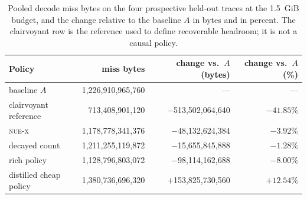 \begin{table}[t]
\centering
\caption{Pooled decode miss bytes on the four prospective held-out traces at the 1.5~GiB budget, and the change relative to the baseline $A$ in bytes and in percent. The clairvoyant row is the reference used to define recoverable headroom; it is not a causal policy.}
\label{tab:miss}
\small
\begin{tabular}{lrrr}
\toprule
Policy & miss bytes & change vs.\ $A$ (bytes) & change vs.\ $A$ (\%) \\
\midrule
baseline $A$ & 1{,}226{,}910{,}965{,}760 & --- & --- \\
clairvoyant reference & 713{,}408{,}901{,}120 & $-$513{,}502{,}064{,}640 & $-41.85\%$ \\
\textsc{nue-x} & 1{,}178{,}778{,}341{,}376 & $-$48{,}132{,}624{,}384 & $-3.92\%$ \\
decayed count & 1{,}211{,}255{,}119{,}872 & $-$15{,}655{,}845{,}888 & $-1.28\%$ \\
rich policy & 1{,}128{,}796{,}803{,}072 & $-$98{,}114{,}162{,}688 & $-8.00\%$ \\
distilled cheap policy & 1{,}380{,}736{,}696{,}320 & $+$153{,}825{,}730{,}560 & $+12.54\%$ \\
\bottomrule
\end{tabular}
\end{table}
